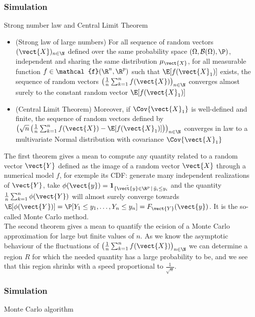 \documentclass[8pt]{beamer}
\begin{document}
\begin{frame}
  \frametitle{Simulation}
  \begin{block}{Strong number law and Central Limit Theorem}
    \begin{itemize}
    \item \alert{(Strong law of large numbers)} For all sequence of random vectors $(\vect{X})_{n\in\N}$ defined over the \alert{same} probability space $(\Omega, \mathcal{B}(\Omega), \P)$, \alert{independent} and \alert{sharing the same distribution $\mu_{\vect{X}}$}, for all measurable function $f\in\mathcal{f}(\R^n,\R^p)$ such that $\E[f(\vect{X}_1)]$ exists, \alert{the sequence of random vectors $\left(\frac{1}{n}\sum_{k=1}^nf(\vect{X})\right)_{n\in\N}$ converges almost surely to the constant random vector $\E[f(\vect{X}_1)]$}
    \item \alert{(Central Limit Theorem)} Moreover, \alert{if $\Cov{\vect{X}_1}$ is well-defined and finite}, the sequence of random vectors defined by \alert{$\left(\sqrt{n}\left(\frac{1}{n}\sum_{k=1}^nf(\vect{X})-\E[f(\vect{X}_1)]\right)\right)_{n\in\N}$ converges in law to a multivariate Normal distribution with covariance $\Cov{\vect{X}_1}$}
    \end{itemize}
    The first theorem gives a mean to compute any quantity related to a random vector $\vect{Y}$ defined as the image of a random vector $\vect{X}$ through a numerical model $f$, for exemple its CDF: generate many independent realizations of $\vect{Y}$, take $\phi(\vect{y})=\mathbf{1}_{\{\tilde{\vect{y}}\in\R^p\,|\,\tilde{y}_i\leq y_i}$ and the quantity $\frac{1}{n}\sum_{k=1}^n\phi(\vect{Y})$ will almost surely converge towards $\E[\phi(\vect{Y})]=\P[Y_1\leq y_1,\dots,Y_n\leq y_n]=F_{\vect{Y}}(\vect{y})$. It is the so-called \alert{Monte Carlo method}.\\
    The second theorem gives a mean to quantify the ecision of a Monte Carlo approximation for large but finite values of $n$. As we know the asymptotic behaviour of the fluctuations of $\left(\frac{1}{n}\sum_{k=1}^nf(\vect{X})\right)_{n\in\N}$ we can determine a region $R$ for which the needed quantity has a large probability to be, and we see that this region shrinks with a speed proportional to $\frac{1}{\sqrt{n}}$.
  \end{block}
\end{frame}
\begin{frame}
  \frametitle{Simulation}
  \begin{block}{Monte Carlo algorithm}
    \centering {}
  \end{block}
\end{frame}
\end{document}
